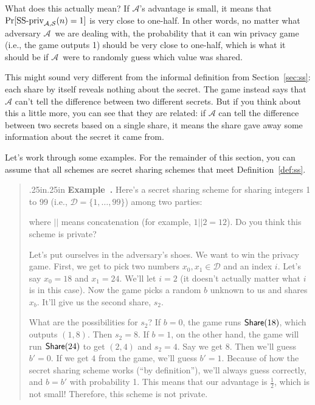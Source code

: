 \documentclass[12 pt]{article}
\def\D{\ensuremath{\mathcal{D}}}
\def\A{\ensuremath{\mathcal{A}}}
\def\ss{\ensuremath{\mathcal{S}}}
\newcounter{example}[section]
\newenvironment{example}{\refstepcounter{example}\par\bigskip \begin{quotation}{}{\leftmargin .25in\rightmargin .25in}
    \noindent \textbf{Example~\thesection.\theexample }  \rmfamily}{\end{quotation}\par\bigskip}
\begin{document}
What does this actually mean? If $\A$'s advantage is small, it means that 
$\Pr[\textnormal{SS-priv}_{\A,\ss}(n)=1]$ is very close to one-half. In 
other words, no matter what adversary \A~we are dealing with, the probability 
that it can win privacy game (i.e., the game outputs 1) should be very close
to one-half, which is what it should be if \A~were to randomly guess which 
value was shared.

This might sound very different from the informal definition from Section~\ref{sec:ss}:
each share by itself reveals nothing about the secret. The game instead says 
that $\A$ can't tell the difference between two different secrets. But if 
you think about this a little more, you can see that they are related: if 
$\A$ can tell the difference between two secrets based on a single share, 
it means the share gave away some information about the secret it came from.

\bigskip
Let's work through some examples. For the remainder of this section, you can 
assume that all schemes are secret sharing schemes that meet Definition~\ref{def:ss}.

\begin{example}
    Here's a secret sharing scheme for sharing integers 1 to 99 (i.e., 
    $\D = \{1, \ldots, 99\}$) among two parties:
    \begin{pchstack}[center]
    \pchspace
    \end{pchstack}
    where $||$ means concatenation (for example, $1 || 2 = 12$). Do you 
    think this scheme is private?

    Let's put ourselves in the adversary's shoes. We want to win the 
    privacy game. First, we get to pick two numbers $x_0, x_1 \in \D$ and 
    an index $i$. Let's say $x_0 = 18$ and $x_1 = 24$. We'll let $i=2$ 
    (it doesn't actually matter what $i$ is in this case). Now the game 
    picks a random $b$ unknown to us and shares $x_b$. It'll give us the 
    second share, $s_2$. 
    
    What are the possibilities for $s_2$? If $b=0$, the game runs $\mathsf{Share}(18)$,
    which outputs $(1,8)$. Then $s_2 = 8$. If $b=1$, on the other hand, 
    the game will run $\mathsf{Share}(24)$ to get $(2,4)$ and $s_2 = 4$. Say 
    we get $8$. Then we'll guess $b' = 0$. If we get $4$ from the game, we'll 
    guess $b'=1$. Because of how the secret sharing scheme works (``by 
    definition''), we'll always guess correctly, and $b=b'$ with probability 
    1. This means that our advantage is $\frac{1}{2}$, which is not small!
    Therefore, this scheme is not private.
\end{example}
\end{document}
